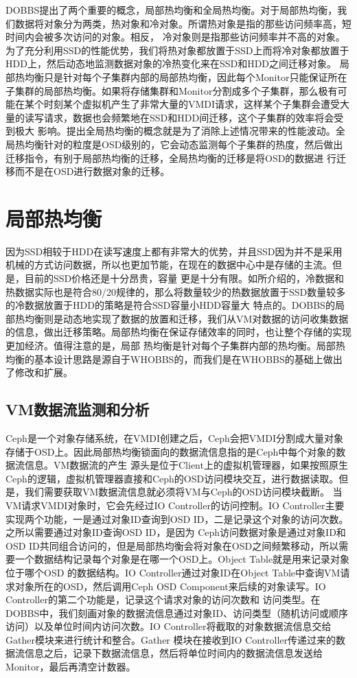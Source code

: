 DOBBS提出了两个重要的概念，局部热均衡和全局热均衡。对于局部热均衡，我们数据将对象分为两类，热对象和冷对象。所谓热对象是指的那些访问频率高，短时间内会被多次访问的对象。相反，
冷对象则是指那些访问频率并不高的对象。为了充分利用SSD的性能优势，我们将热对象都放置于SSD上而将冷对象都放置于HDD上，然后动态地监测数据对象的冷热变化来在SSD和HDD之间迁移对象。
局部热均衡只是针对每个子集群内部的局部热均衡，因此每个Monitor只能保证所在子集群的局部热均衡。如果将存储集群和Monitor分割成多个子集群，那么极有可能在某个时刻某个虚拟机产生了非常大量的VMDI请求，这样某个子集群会遭受大量的读写请求，数据也会频繁地在SSD和HDD间迁移，这个子集群的效率将会受到极大
影响。提出全局热均衡的概念就是为了消除上述情况带来的性能波动。全局热均衡针对的粒度是OSD级别的，它会动态监测每个子集群的热度，然后做出迁移指令，有别于局部热均衡的迁移，全局热均衡的迁移是将OSD的数据进
行迁移而不是在OSD进行数据对象的迁移。

\section{局部热均衡}
因为SSD相较于HDD在读写速度上都有非常大的优势，并且SSD因为并不是采用机械的方式访问数据，所以也更加节能，在现在的数据中心中是存储的主流。但是，目前的SSD价格还是十分昂贵，容量
更是十分有限。如所介绍的，冷数据和热数据实际也是符合80/20规律的，那么将数量较少的热数据放置于SSD数量较多的冷数据放置于HDD的策略是符合SSD容量小HDD容量大
特点的。DOBBS的局部热均衡则是动态地实现了数据的放置和迁移，我们从VM对数据的访问收集数据的信息，做出迁移策略。局部热均衡在保证存储效率的同时，也让整个存储的实现更加经济。值得注意的是，局部
热均衡是针对每个子集群内部的热均衡。局部热均衡的基本设计思路是源自于WHOBBS的，而我们是在WHOBBS的基础上做出了修改和扩展。

\subsection{VM数据流监测和分析}
Ceph是一个对象存储系统，在VMDI创建之后，Ceph会把VMDI分割成大量对象存储于OSD上\cite{weil2006ceph}。因此局部热均衡锁面向的数据流信息指的是Ceph中每个对象的数据流信息。VM数据流的产生
源头是位于Client上的虚拟机管理器，如果按照原生Ceph的逻辑，虚拟机管理器直接和Ceph的OSD访问模块交互，进行数据读取。但是，我们需要获取VM数据流信息就必须将VM与Ceph的OSD访问模块截断。
当VM请求VMDI对象时，它会先经过IO Controller的访问控制。IO Controller主要实现两个功能，一是通过对象ID查询到OSD ID，二是记录这个对象的访问次数。之所以需要通过对象ID查询OSD ID，是因为
Ceph访问数据对象是通过对象ID和OSD ID共同组合访问的，但是局部热均衡会将对象在OSD之间频繁移动，所以需要一个数据结构记录每个对象是在哪一个OSD上。Object Table就是用来记录对象位于哪个OSD
的数据结构。IO Controller通过对象ID在Object Table中查询VM请求对象所在的OSD，然后调用Ceph OSD Component来后续的对象读写。IO Controller的第二个功能是，记录这个请求对象的访问次数和
访问类型。在DOBBS中，我们刻画对象的数据流信息通过对象ID、访问类型（随机访问或顺序访问）以及单位时间内访问次数。IO Controller将截取的对象数据流信息交给Gather模块来进行统计和整合。Gather
模块在接收到IO Controller传递过来的数据流信息之后，记录下数据流信息，然后将单位时间内的数据流信息发送给Monitor，最后再清空计数器。

